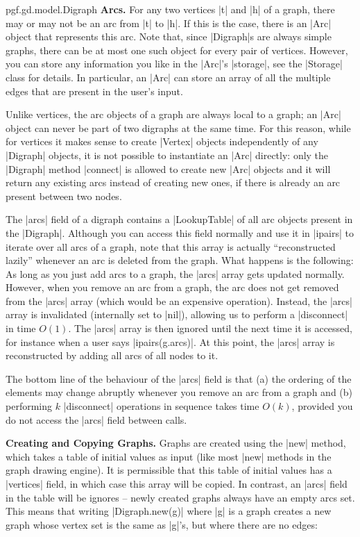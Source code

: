 \begin{luaclass}{pgf.gd.model.}{Digraph}
  \medskip
  \noindent\textbf{Arcs.}
  For any two vertices |t| and |h| of a graph, there may or may not be
  an arc from |t| to |h|. If this is the case, there is an |Arc|
  object that represents this arc. Note that, since |Digraph|s are
  always simple graphs, there can be at most one such object for every
  pair of vertices. However, you can store any information you like in
  the |Arc|'s |storage|, see the |Storage| class for details. In
  particular, an |Arc| can store an array of all the multiple edges
  that are present in the user's input.

  Unlike vertices, the arc objects of a graph are always local to a
  graph; an |Arc| object can never be part of two digraphs at the same
  time. For this reason, while for vertices it makes sense to create
  |Vertex| objects independently of any |Digraph| objects, it is not
  possible to instantiate an |Arc| directly: only the |Digraph| method
  |connect| is allowed to create new |Arc| objects and it will return
  any existing arcs instead of creating new ones, if there is already
  an arc present between two nodes.

  The |arcs| field of a digraph contains a |LookupTable| of all arc
  objects present in the |Digraph|. Although you can access this field
  normally and use it in |ipairs| to iterate over all arcs of a graph,
  note that this array is actually ``reconstructed lazily'' whenever
  an arc is deleted from the graph. What happens is the following: As
  long as you just add arcs to a graph, the |arcs| array gets updated
  normally. However, when you remove an arc from a graph, the arc does
  not get removed from the |arcs| array (which would be an expensive
  operation). Instead, the |arcs| array is invalidated (internally set
  to |nil|), allowing us to perform a |disconnect| in time
  $O(1)$. The |arcs| array is then ignored until the next time it is
  accessed, for instance when a user says |ipairs(g.arcs)|. At this
  point, the |arcs| array is reconstructed by adding all arcs of all
  nodes to it.

  The bottom line of the behaviour of the |arcs| field is that (a) the
  ordering of the elements may change abruptly whenever you remove an
  arc from a graph and (b) performing $k$ |disconnect| operations in
  sequence takes time $O(k)$, provided you do not access the |arcs|
  field between calls.
  
  \medskip
  \noindent\textbf{Creating and Copying Graphs.}
  Graphs are created using the |new| method, which takes a table of
  initial values as input (like most |new| methods in the graph
  drawing engine). It is permissible that this table of initial values
  has a |vertices| field, in which case this array will be copied. In
  contrast, an |arcs| field in the table will be ignores -- newly
  created graphs always have an empty arcs set. This means that
  writing |Digraph.new(g)| where |g| is a graph creates a new graph
  whose vertex set is the same as |g|'s, but where there are no edges:
  

\end{luaclass}
